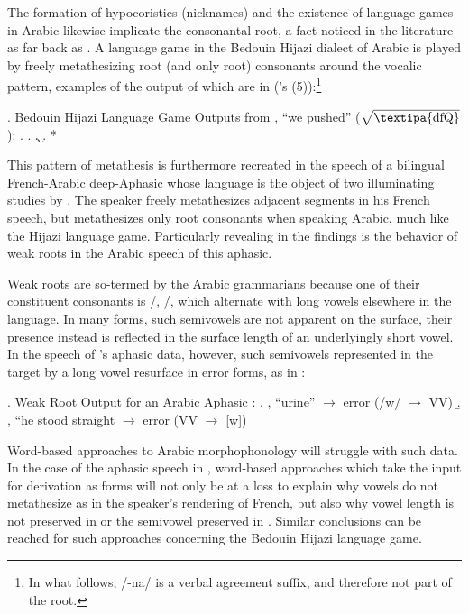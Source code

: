 \documentclass[12pt,twoside,letterpaper]{article}
\begin{document}
The formation of hypocoristics (nicknames) and the existence of language games in Arabic likewise implicate the consonantal root, a fact noticed in the literature as far back as \cite[pp.379--80]{mccarthy81}. A language game in the Bedouin Hijazi dialect of Arabic is played by freely metathesizing root (and only root) consonants around the vocalic pattern, examples of the output of which are in \Next (\cite{mccarthy81}'s (5)):\footnote{In what follows, /-na/ is a verbal agreement suffix, and therefore not part of the root.}

\ex. Bedouin Hijazi Language Game Outputs from {\em {}}, ``we pushed'' ($\sqrt{\textrm{\textipa{dfQ}}}$):
\a. 
\b.
\c. 
\d. *

This pattern of metathesis is furthermore recreated in the speech of a bilingual French-Arabic deep-Aphasic whose language is the object of two illuminating studies by \cite{prunet00,idrissi08}. The speaker freely metathesizes adjacent segments in his French speech, but metathesizes only root consonants when speaking Arabic, much like the Hijazi language game. Particularly revealing in the findings is the behavior of weak roots in the Arabic speech of this aphasic.

Weak roots are so-termed by the Arabic grammarians because one of their constituent consonants is /, /, which alternate with long vowels elsewhere in the language. In many forms, such semivowels are not apparent on the surface, their presence instead is reflected in the surface length of an underlyingly short vowel. In the speech of \cite{idrissi08}'s aphasic data, however, such semivowels represented in the target by a long vowel resurface in error forms, as in \Next:

\ex. Weak Root Output for an Arabic Aphasic \citep[p.225]{idrissi08}:
\a. {\em {}}, ``urine'' $\rightarrow$ error {\em {}} (/w/ $\rightarrow$ \textsc{VV})
\b. {\em {}}, ``he stood straight $\rightarrow$ error {\em {}} (\textsc{VV} $\rightarrow$ [w])

Word-based approaches to Arabic morphophonology will struggle with such data. In the case of the aphasic speech in \Last, word-based approaches which take the input for derivation as {\em {}} forms will not only be at a loss to explain why vowels do not metathesize as in the speaker's rendering of French, but also why vowel length is not preserved in \Last[b] or the semivowel preserved in \Last[a]. Similar conclusions can be reached for such approaches concerning the Bedouin Hijazi language game.
\end{document}
